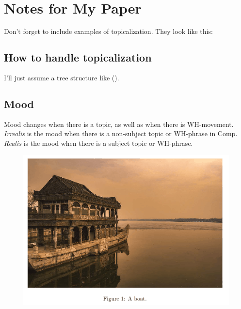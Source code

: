 \documentclass[12pt]{article}
\begin{document}
\section*{Notes for My Paper}

Don't forget to include examples of topicalization.
They look like this:

{\small
{}
}

\subsection*{How to handle topicalization}

I'll just assume a tree structure like ().

{\small
{}
}

\subsection*{Mood}

Mood changes when there is a topic, as well as when
there is WH-movement.  \emph{Irrealis} is the mood when
there is a non-subject topic or WH-phrase in Comp.
\emph{Realis} is the mood when there is a subject topic
or WH-phrase.

\begin{figure}
  \includegraphics[width=\linewidth]{boat.png}
\end{figure}
\end{document}
